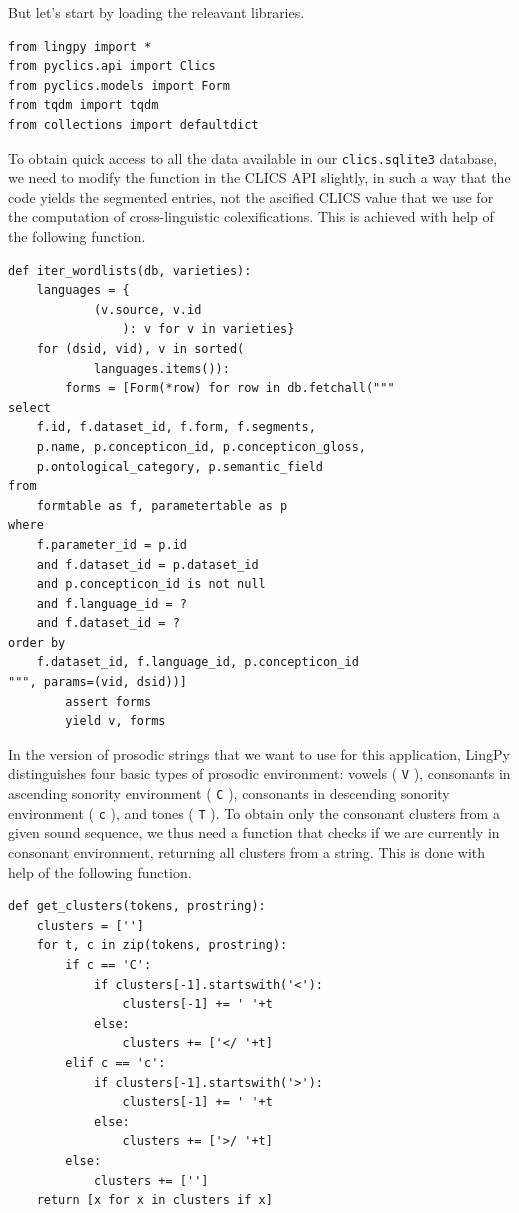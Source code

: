\documentclass[
  english,
  a4paper,
  oneside,tablecaptionabove
]{scrbook}
\newcommand{\passthrough}[1]{#1}
\begin{document}
But let's start by loading the releavant libraries.

\begin{lstlisting}
from lingpy import *
from pyclics.api import Clics
from pyclics.models import Form
from tqdm import tqdm
from collections import defaultdict
\end{lstlisting}

To obtain quick access to all the data available in our
\passthrough{\lstinline!clics.sqlite3!} database, we need to modify the
function in the CLICS API slightly, in such a way that the code yields
the segmented entries, not the ascified CLICS value that we use for the
computation of cross-linguistic colexifications. This is achieved with
help of the following function.

\begin{lstlisting}
def iter_wordlists(db, varieties):
    languages = {
            (v.source, v.id
                ): v for v in varieties}
    for (dsid, vid), v in sorted(
            languages.items()):
        forms = [Form(*row) for row in db.fetchall("""
select
    f.id, f.dataset_id, f.form, f.segments,
    p.name, p.concepticon_id, p.concepticon_gloss,
    p.ontological_category, p.semantic_field 
from
    formtable as f, parametertable as p
where
    f.parameter_id = p.id
    and f.dataset_id = p.dataset_id
    and p.concepticon_id is not null
    and f.language_id = ?
    and f.dataset_id = ?
order by
    f.dataset_id, f.language_id, p.concepticon_id
""", params=(vid, dsid))]
        assert forms
        yield v, forms
\end{lstlisting}

In the version of prosodic strings that we want to use for this
application, LingPy distinguishes four basic types of prosodic
environment: vowels ( \passthrough{\lstinline!V!} ), consonants in
ascending sonority environment ( \passthrough{\lstinline!C!} ),
consonants in descending sonority environment (
\passthrough{\lstinline!c!} ), and tones ( \passthrough{\lstinline!T!}
). To obtain only the consonant clusters from a given sound sequence, we
thus need a function that checks if we are currently in consonant
environment, returning all clusters from a string. This is done with
help of the following function.

\begin{lstlisting}
def get_clusters(tokens, prostring):
    clusters = ['']
    for t, c in zip(tokens, prostring):
        if c == 'C':
            if clusters[-1].startswith('<'):
                clusters[-1] += ' '+t
            else:
                clusters += ['</ '+t]
        elif c == 'c':
            if clusters[-1].startswith('>'):
                clusters[-1] += ' '+t
            else:
                clusters += ['>/ '+t]
        else:
            clusters += ['']
    return [x for x in clusters if x]
\end{lstlisting}
\end{document}
